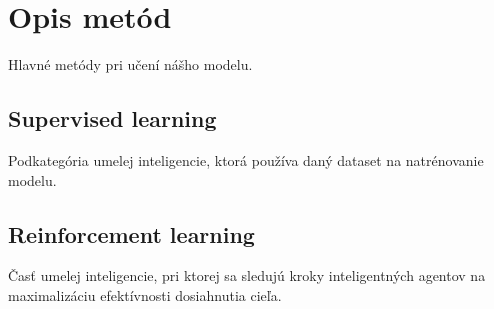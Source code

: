 \section{Opis metód}
Hlavné metódy pri učení nášho modelu.
\subsection{Supervised learning}
Podkategória umelej inteligencie, ktorá používa daný dataset na natrénovanie modelu.

\subsection{Reinforcement learning}
Časť umelej inteligencie, pri ktorej sa sledujú kroky inteligentných agentov na maximalizáciu efektívnosti dosiahnutia cieľa.
